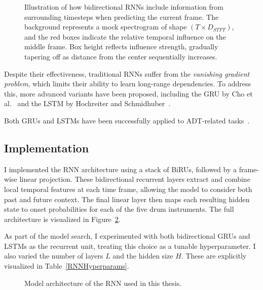 \begin{figure}[H]
    \centering
    
    \caption{Illustration of how bidirectional \glspl{RNN} include information from surrounding timesteps when predicting the current frame. The background represents a mock spectrogram of shape $(T \times D_{STFT})$, and the red boxes indicate the relative temporal influence on the middle frame. Box height reflects influence strength, gradually tapering off as distance from the center sequentially increases.}
    \label{RNNInfluenceFigure}
\end{figure}

Despite their effectiveness, traditional \glspl{RNN} suffer from the \textit{vanishing gradient problem}, which limits their ability to learn long-range dependencies. To address this, more advanced variants have been proposed, including the \gls{GRU} by Cho et al.~\cite{DBLP:conf/emnlp/ChoMGBBSB14} and the \gls{LSTM} by Hochreiter and Schmidhuber~\cite{10.1162/neco.1997.9.8.1735}.

Both \glspl{GRU} and \glspl{LSTM} have been successfully applied to \gls{ADT}-related tasks~\cite{Southall2016AutomaticDT, vogl2016recurrent, Vogl2017DrumTV, signals4040042}.

\subsection{Implementation}

I implemented the \gls{RNN} architecture using a stack of \glspl{BiRU}, followed by a frame-wise linear projection. These bidirectional recurrent layers extract and combine local temporal features at each time frame, allowing the model to consider both past and future context. The final linear layer then maps each resulting hidden state to onset probabilities for each of the five drum instruments. The full architecture is visualized in Figure~\ref{RNNFigure}.

As part of the model search, I experimented with both bidirectional \glspl{GRU} and \glspl{LSTM} as the recurrent unit, treating this choice as a tunable hyperparameter. I also varied the number of layers $L$ and the hidden size $H$. These are explicitly visualized in Table~\ref{RNNHyperparams}.

\begin{figure}[H]
    \centering
    
    \caption{Model architecture of the \acrlong{RNN} used in this thesis.}
    \label{RNNFigure}
\end{figure}

